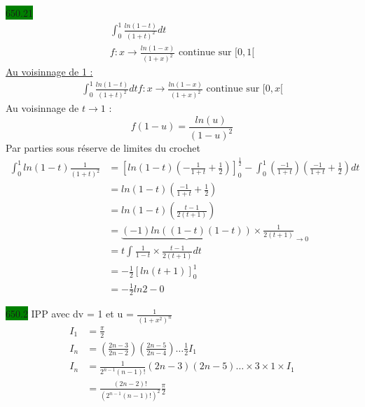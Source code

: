 \documentclass{article}
\begin{document}
\noindent \colorbox{green}{650.21}\\
\begin{align*}
    \int_{0}^{1} \frac{ln(1-t)}{(1+t)^{2}}dt\\
    f:x \rightarrow \frac{ln(1-x)}{(1+x)^{2}} \text{ continue sur }[0, 1[
\end{align*}
\underline{Au voisinnage de 1 : }
\begin{align*}
    \int_{0}^{1} \frac{ln(1-t)}{(1+t)^{2}}dt 
    f:x \rightarrow \frac{ln(1-x)}{(1+x)^{2}} \text{ continue sur }[0, x[
\end{align*}
Au voisinnage de \(t \rightarrow 1\) : 
\begin{equation*}
  f(1-u) = \frac{ln(u)}{(1-u)^{2}}
\end{equation*}
Par parties sous réserve de limites du crochet
\begin{align*}
  \int_{0}^{1}ln(1-t)\frac{1}{(1+t)^{2}} &= [ln(1-t)(-\frac{1}{1+t} + \frac{1}{2})]^{\frac{1}{2}}_{0}
  - \int_{0}^{1}(\frac{-1}{1+t})(\frac{-1}{1+t}+\frac{1}{2})dt \\
                                         &= ln(1-t) (\frac{-1}{1+t}+\frac{1}{2})\\
                                         &= ln(1-t)(\frac{t-1}{2(t+1)})\\
                                         &= \underbrace{(-1)ln((1-t)(1-t))}\times \frac{1}{2(t+1)}_{\rightarrow 0}\\
                                         &= t \int_{}^{}\frac{1}{1-t}\times \frac{t-1}{2(t+1)}dt \\
                                         &= -\frac{1}{2}[ln(t+1)]^{1}_{0}\\
                                         &= -\frac{1}{2}ln2-0
\end{align*}

\noindent \colorbox{green}{650.2}
IPP avec dv = 1 et u = \(\frac{1}{(1+x^{2})^{n}}\)
\begin{align*}
  I_{1} &= \frac{\pi}{2}\\
  I_{n} &= (\frac{2n-3}{2n-2})(\frac{2n-5}{2n-4})\dots \frac{1}{2}I_{1}\\
  I_{n} &= \frac{1}{2^{n-1}(n-1)!}(2n-3)(2n-5)\dots\times 3 \times 1 \times I_{1}\\
        &= \frac{(2n-2)!}{(2^{n-1}(n-1)!)^{2}}\frac{\pi}{2}
\end{align*}
  
\end{document}
